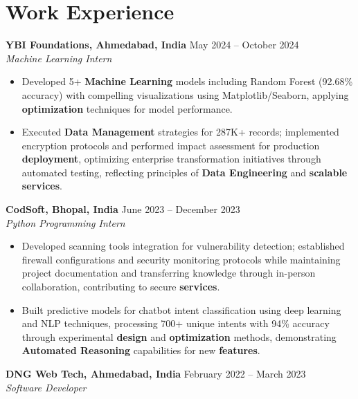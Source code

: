 \documentclass[a4paper,10pt]{article}
\begin{document}
\section*{Work Experience}
\textbf{YBI Foundations, Ahmedabad, India} \hfill May 2024 -- October 2024\\
\textit{Machine Learning Intern} \\
\begin{itemize}[leftmargin=*, itemsep=0pt, parsep=1pt]
\vspace{-6mm}
\item Developed 5+ \textbf{Machine Learning} models including Random Forest (92.68\% accuracy) with compelling visualizations using Matplotlib/Seaborn, applying \textbf{optimization} techniques for model performance.
\item Executed \textbf{Data Management} strategies for 287K+ records; implemented encryption protocols and performed impact assessment for production \textbf{deployment}, optimizing enterprise transformation initiatives through automated testing, reflecting principles of \textbf{Data Engineering} and \textbf{scalable services}.
\end{itemize}
\textbf{CodSoft, Bhopal, India} \hfill June 2023 -- December 2023\\
\textit{Python Programming Intern} \\
\begin{itemize}[leftmargin=*, itemsep=0pt, parsep=1pt]
\vspace{-6mm}
\item Developed scanning tools integration for vulnerability detection; established firewall configurations and security monitoring protocols while maintaining project documentation and transferring knowledge through in-person collaboration, contributing to secure \textbf{services}.
\item Built predictive models for chatbot intent classification using deep learning and NLP techniques, processing 700+ unique intents with 94\% accuracy through experimental \textbf{design} and \textbf{optimization} methods, demonstrating \textbf{Automated Reasoning} capabilities for new \textbf{features}.
\vspace{-1mm}
\end{itemize}

\textbf{DNG Web Tech, Ahmedabad, India} \hfill February 2022 -- March 2023 \\
\textit{Software Developer} \\
\end{document}
